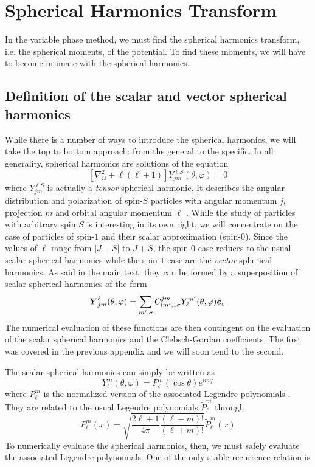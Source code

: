\section{Spherical Harmonics Transform}
In the variable phase method, we must find the spherical 
harmonics transform, i.e. the spherical moments, of the 
potential. To find these moments, we will have to become
intimate with the spherical harmonics. 

\subsection{Definition of the scalar and vector spherical harmonics}
While there is a number of ways to introduce the spherical harmonics, 
we will take the top to bottom approach: from the general to the specific. 
In all generality, spherical harmonics are solutions of the equation
  \begin{equation}
    \left[\nabla^2_\Omega+\ell(\ell+1)\right]Y^{\ell S}_{jm}(\theta,\varphi)=0
  \end{equation}
where $Y_{jm}^{\ell S}$ is actually a \textit{tensor} spherical harmonic. 
It describes the angular distribution and polarization of spin-$S$ particles 
with angular momentum $j$, projection $m$ and orbital angular momentum $\ell$ \cite{VAR1988}.
While the study of particles with arbitrary spin $S$ is interesting in its own right,
we will concentrate on the case of particles of spin-$1$ and their scalar approximation
(spin-$0$). Since the values of $\ell$ range from $|J-S|$ to $J+S$, the 
spin-$0$ case reduces to the usual scalar spherical harmonics while the spin-$1$
case are the \textit{vector} spherical harmonics. As said in the main text, they 
can be formed by a superposition of scalar spherical harmonics of the form
  \begin{equation}
    \boldsymbol{Y}_{jm}^\ell(\theta,\varphi)=\sum_{m',\sigma}C_{lm',1\sigma}^{jm}Y_\ell^{m'}(\theta,\varphi)\hat{\boldsymbol{e}}_\sigma
  \end{equation}
The numerical evaluation of these functions are then contingent on the evaluation of the
scalar spherical harmonics and the Clebsch-Gordan coefficients. The first was covered in the 
previous appendix and we will soon tend to the second. 

The scalar spherical harmonics can simply be written as
  \begin{equation}
   Y_{\ell}^m(\theta,\varphi) = P_\ell^m(\cos\theta)e^{im\varphi}
  \end{equation}
where $P_\ell^m$ is the normalized version of the associated 
Legendre polynomials \cite{PRE2007}. They are related to
the usual Legendre polynomials $\widetilde{P}_\ell^m$ through
  \begin{equation}
    P_\ell^m(x) = \sqrt{\frac{2\ell+1}{4\pi}\frac{(\ell-m)!}{(\ell+m)!}}\widetilde{P}_\ell^m(x)
  \end{equation}
To numerically evaluate the spherical harmonics, then, we must safely 
evaluate the associated Legendre polynomials. One of the only 
stable recurrence relation is \cite{PRE2007}
  
